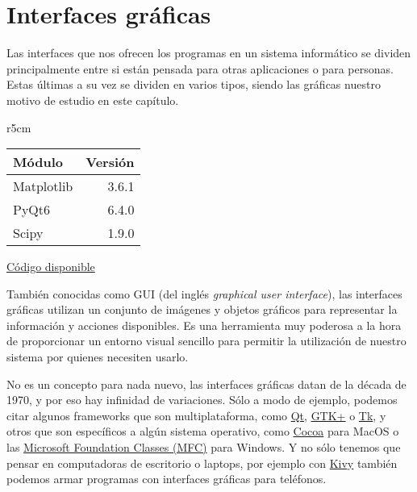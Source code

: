 

\chapter{Interfaces gráficas} \label{ch:guis}

Las interfaces que nos ofrecen los programas en un sistema informático se dividen principalmente entre si están pensada para otras aplicaciones o para personas. Estas últimas a su vez se dividen en varios tipos, siendo las gráficas nuestro motivo de estudio en este capítulo.

\begin{wraptable}{r}{5cm}
\begin{modulesinfo}
\begin{center}
{\small
    \begin{tabular}{l r}
        \toprule
        \textbf{Módulo} & \textbf{Versión} \\
        \midrule
        Matplotlib & 3.6.1 \\
        PyQt6 & 6.4.0 \\
        Scipy & 1.9.0 \\
        \bottomrule
    \end{tabular}
    \vspace{0.75em}
    
    \href{https://github.com/facundobatista/libro-pyciencia/tree/master/código/guis/}{Código disponible}
}
\end{center}
\end{modulesinfo}
\end{wraptable}

También conocidas como GUI (del inglés \textit{graphical user interface}), las interfaces gráficas utilizan un conjunto de imágenes y objetos gráficos para representar la información y acciones disponibles. Es una herramienta muy poderosa a la hora de proporcionar un entorno visual sencillo para permitir la utilización de nuestro sistema por quienes necesiten usarlo.

No es un concepto para nada nuevo, las interfaces gráficas datan de la década de 1970, y por eso hay infinidad de variaciones. Sólo a modo de ejemplo, podemos citar algunos frameworks que son multiplataforma, como \href{https://www.qt.io/}{Qt}, \href{https://www.gtk.org/}{GTK+} o \href{https://www.tcl.tk/}{Tk}, y otros que son específicos a algún sistema operativo, como \href{https://en.wikipedia.org/wiki/Cocoa_(API)}{Cocoa} para MacOS o las \href{https://learn.microsoft.com/en-us/cpp/mfc/mfc-desktop-applications}{Microsoft Foundation Classes (MFC)} para Windows. Y no sólo tenemos que pensar en computadoras de escritorio o laptops, por ejemplo con \href{https://kivy.org/}{Kivy} también podemos armar programas con interfaces gráficas para teléfonos.

